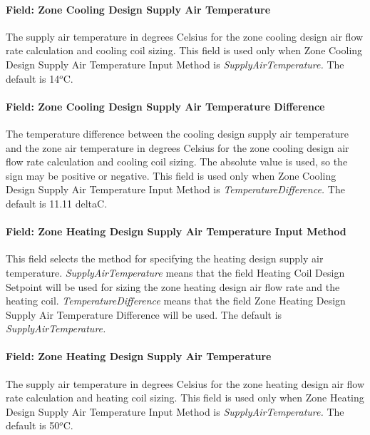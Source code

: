 \paragraph{Field: Zone Cooling Design Supply Air Temperature}\label{field-zone-cooling-design-supply-air-temperature-1}

The supply air temperature in degrees Celsius for the zone cooling design air flow rate calculation and cooling coil sizing. This field is used only when Zone Cooling Design Supply Air Temperature Input Method is \emph{SupplyAirTemperature.} The default is 14\(^{o}\)C.

\paragraph{Field: Zone Cooling Design Supply Air Temperature Difference}\label{field-zone-cooling-design-supply-air-temperature-difference-2}

The temperature difference between the cooling design supply air temperature and the zone air temperature in degrees Celsius for the zone cooling design air flow rate calculation and cooling coil sizing. The absolute value is used, so the sign may be positive or negative. This field is used only when Zone Cooling Design Supply Air Temperature Input Method is \emph{TemperatureDifference.} The default is 11.11 deltaC.

\paragraph{Field: Zone Heating Design Supply Air Temperature Input Method}\label{field-zone-heating-design-supply-air-temperature-input-method-2}

This field selects the method for specifying the heating design supply air temperature. \emph{SupplyAirTemperature} means that the field Heating Coil Design Setpoint will be used for sizing the zone heating design air flow rate and the heating coil. \emph{TemperatureDifference} means that the field Zone Heating Design Supply Air Temperature Difference will be used. The default is \emph{SupplyAirTemperature.}

\paragraph{Field: Zone Heating Design Supply Air Temperature}\label{field-zone-heating-design-supply-air-temperature-1}

The supply air temperature in degrees Celsius for the zone heating design air flow rate calculation and heating coil sizing. This field is used only when Zone Heating Design Supply Air Temperature Input Method is \emph{SupplyAirTemperature.} The default is 50\(^{o}\)C.

